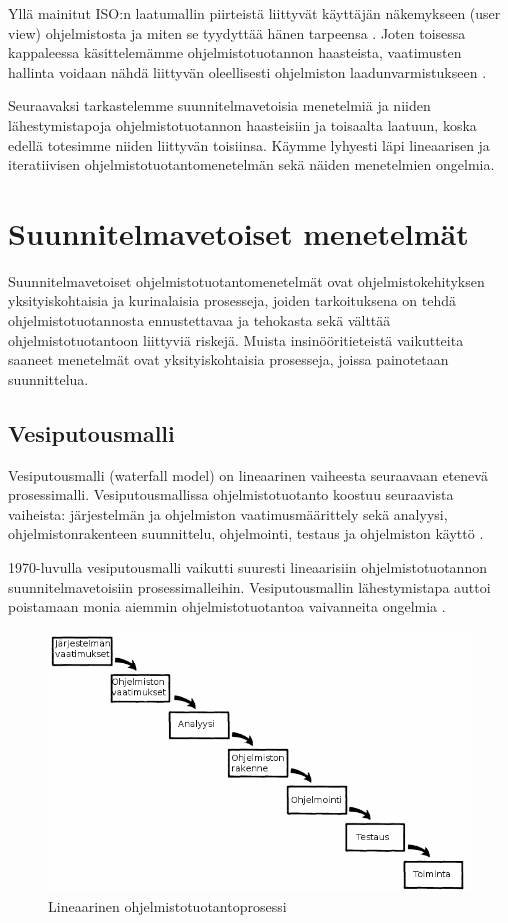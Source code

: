 \documentclass[finnish]{tktltiki2}
\theoremstyle{definition}
\theoremstyle{remark}
\begin{document}
Yllä mainitut ISO:n laatumallin piirteistä liittyvät käyttäjän näkemykseen (user view) ohjelmistosta ja miten se tyydyttää hänen tarpeensa \cite{KIP96}. Joten toisessa kappaleessa käsittelemämme ohjelmistotuotannon haasteista, vaatimusten hallinta voidaan nähdä liittyvän oleellisesti ohjelmiston laadunvarmistukseen \cite{BOE88}. 

Seuraavaksi tarkastelemme suunnitelmavetoisia menetelmiä ja niiden lähestymistapoja ohjelmistotuotannon haasteisiin ja toisaalta laatuun, koska edellä totesimme niiden liittyvän toisiinsa. Käymme lyhyesti läpi lineaarisen ja iteratiivisen ohjelmistotuotantomenetelmän sekä näiden menetelmien ongelmia.

\section{Suunnitelmavetoiset menetelmät}

Suunnitelmavetoiset ohjelmistotuotantomenetelmät ovat ohjelmistokehityksen yksityiskohtaisia ja kurinalaisia prosesseja, joiden tarkoituksena on tehdä ohjelmistotuotannosta ennustettavaa ja tehokasta sekä välttää ohjelmistotuotantoon liittyviä riskejä. Muista insinööritieteistä vaikutteita saaneet menetelmät ovat yksityiskohtaisia prosesseja, joissa painotetaan suunnittelua\cite{FOW01a}.

\subsection{Vesiputousmalli}

Vesiputousmalli (waterfall model) on lineaarinen vaiheesta seuraavaan etenevä prosessimalli. Vesiputousmallissa ohjelmistotuotanto koostuu seuraavista vaiheista: järjestelmän ja ohjelmiston vaatimusmäärittely sekä analyysi, ohjelmistonrakenteen suunnittelu, ohjelmointi, testaus ja ohjelmiston käyttö \cite{ROY70}.

1970-luvulla vesiputousmalli vaikutti suuresti lineaarisiin ohjelmistotuotannon suunnitelmavetoisiin prosessimalleihin. Vesiputousmallin lähestymistapa auttoi poistamaan monia aiemmin ohjelmistotuotantoa vaivanneita ongelmia \cite{BOE88}.

\begin{figure}[h!]
  \caption{Lineaarinen ohjelmistotuotantoprosessi}
  \centering
    \includegraphics[width=\textwidth]{waterfall}
\end{figure}
\end{document}
